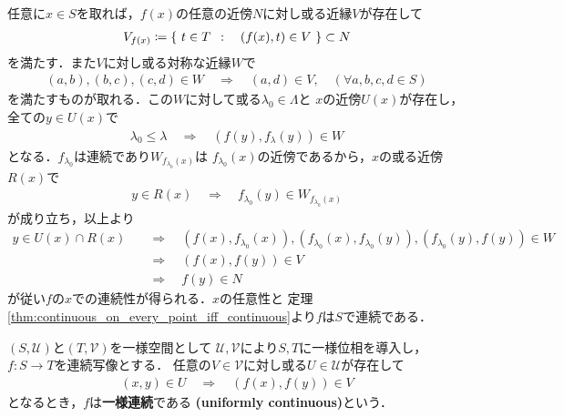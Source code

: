 	\begin{prf}
		任意に$x \in S$を取れば，$f(x)$の任意の近傍$N$に対し或る近縁$V$が存在して
		\begin{align}
			V_{f(x)} \coloneqq \left\{\ t \in T\ \, : \quad (f(x),t) \in V\ \right\} \subset N
		\end{align}
		を満たす．また$V$に対し或る対称な近縁$W$で
		\begin{align}
			(a,b),(b,c),(c,d) \in W \quad \Longrightarrow \quad
			(a,d) \in V,
			\quad (\forall a,b,c,d \in S)
		\end{align}
		を満たすものが取れる．この$W$に対して或る$\lambda_0 \in \Lambda$と
		$x$の近傍$U(x)$が存在し，全ての$y \in U(x)$で
		\begin{align}
			\lambda_0 \leq \lambda \quad \Longrightarrow \quad
			(f(y),f_\lambda(y)) \in W
		\end{align}
		となる．$f_{\lambda_0}$は連続であり$W_{f_{\lambda_0}(x)}$は
		$f_{\lambda_0}(x)$の近傍であるから，$x$の或る近傍$R(x)$で
		\begin{align}
			y \in R(x) \quad \Longrightarrow \quad
			f_{\lambda_0}(y) \in W_{f_{\lambda_0}(x)}
		\end{align}
		が成り立ち，以上より
		\begin{align}
			y \in U(x) \cap R(x) &\quad \Longrightarrow \quad
			(f(x),f_{\lambda_0}(x)),(f_{\lambda_0}(x),f_{\lambda_0}(y))
			,(f_{\lambda_0}(y),f(y)) \in W \\
			&\quad \Longrightarrow \quad (f(x),f(y)) \in V \\
			&\quad \Longrightarrow \quad f(y) \in N
		\end{align}
		が従い$f$の$x$での連続性が得られる．$x$の任意性と
		定理\ref{thm:continuous_on_every_point_iff_continuous}より$f$は$S$で連続である．
		\QED
	\end{prf}
	
	\begin{screen}
		\begin{thm}
		\end{thm}
	\end{screen}
	
	\begin{screen}
		\begin{dfn}[一様連続性]
			$(S,\mathscr{U})$と$(T,\mathscr{V})$を一様空間として
			$\mathscr{U},\mathscr{V}$により$S,T$に一様位相を導入し，
			$f:S \longrightarrow T$を連続写像とする．
			任意の$V \in \mathscr{V}$に対し或る$U \in \mathscr{U}$が存在して
			\begin{align}
				(x,y) \in U \quad \Longrightarrow \quad (f(x),f(y)) \in V
			\end{align}
			となるとき，$f$は{\bf 一様連続}\index{いちようれんぞく@一様連続}である
			{\bf (uniformly continuous)}という．
		\end{dfn}
	\end{screen}
	

